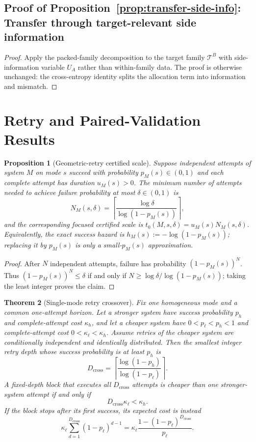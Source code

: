 \documentclass[10pt]{article}
\theoremstyle{paperplain}
\newtheorem{theorem}{Theorem}[section]
\newtheorem{proposition}[theorem]{Proposition}
\theoremstyle{paperdefinition}
\theoremstyle{paperremark}
\newcommand{\cT}{\mathcal{T}}
\begin{document}
\subsection{Proof of Proposition~\ref{prop:transfer-side-info}: Transfer through target-relevant side information}
\label{app:proof:prop:transfer-side-info}

\begin{proof}
Apply the packed-family decomposition to the target family $\cT^B$ with side-information variable $U_A$ rather than within-family data.
The proof is otherwise unchanged: the cross-entropy identity splits the allocation term into information and mismatch.
\end{proof}

\clearpage
\section{Retry and Paired-Validation Results}
\label{app:retry-and-validation}

\begin{proposition}[Geometric-retry certified scale]
\label{prop:geometric-certified-scale}
Suppose independent attempts of system $M$ on mode $s$ succeed with probability $p_M(s)\in(0,1)$ and each complete attempt has duration $u_M(s)>0$.
The minimum number of attempts needed to achieve failure probability at most $\delta\in(0,1)$ is
\[
N_M(s,\delta)
=
\left\lceil\frac{\log\delta}{\log(1-p_M(s))}\right\rceil,
\]
and the corresponding focused certified scale is $t_0(M,s,\delta)=u_M(s)N_M(s,\delta)$.
Equivalently, the exact success hazard is $h_M(s):=-\log(1-p_M(s))$; replacing it by $p_M(s)$ is only a small-$p_M(s)$ approximation.
\end{proposition}

\begin{proof}
After $N$ independent attempts, failure has probability $(1-p_M(s))^N$.
Thus $(1-p_M(s))^N\le\delta$ if and only if
$N\ge\log\delta/\log(1-p_M(s))$; taking the least integer proves the claim.
\end{proof}

\begin{theorem}[Single-mode retry crossover]
\label{thm:retry-crossover}
Fix one homogeneous mode and a common one-attempt horizon.
Let a stronger system have success probability $p_h$ and complete-attempt cost $\kappa_h$, and let a cheaper system have $0<p_\ell<p_h<1$ and complete-attempt cost $0<\kappa_\ell<\kappa_h$.
Assume retries of the cheaper system are conditionally independent and identically distributed.
Then the smallest integer retry depth whose success probability is at least $p_h$ is
\[
D_{\mathrm{cross}}
=
\left\lceil
\frac{\log(1-p_h)}{\log(1-p_\ell)}
\right\rceil.
\]
A fixed-depth block that executes all $D_{\mathrm{cross}}$ attempts is cheaper than one stronger-system attempt if and only if
\[
D_{\mathrm{cross}}\kappa_\ell<\kappa_h.
\]
If the block stops after its first success, its expected cost is instead
\[
\kappa_\ell\sum_{d=1}^{D_{\mathrm{cross}}}(1-p_\ell)^{d-1}
=
\kappa_\ell\frac{1-(1-p_\ell)^{D_{\mathrm{cross}}}}{p_\ell}.
\]
\end{theorem}
\end{document}
